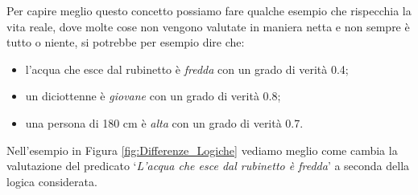 \documentclass[a4paper,12pt]{report}
\begin{document}
\bigskip

Per capire meglio questo concetto possiamo fare qualche esempio che rispecchia la vita reale, dove molte cose non vengono valutate in maniera netta e non sempre è tutto o niente, si potrebbe per esempio dire che:


\begin{itemize}
    \item l'acqua che esce dal rubinetto è  \textit{fredda} con un grado di verità 0.4;
    \item un diciottenne è \textit{giovane} con un grado di verità 0.8;
    \item una persona di 180 cm è \textit{alta} con un grado di verità 0.7.
\end{itemize}

\noindent Nell'esempio in Figura \ref{fig:Differenze_Logiche} vediamo meglio come cambia la valutazione del predicato `\textit{L'acqua che esce dal rubinetto è fredda}' a seconda della logica considerata.
\end{document}
